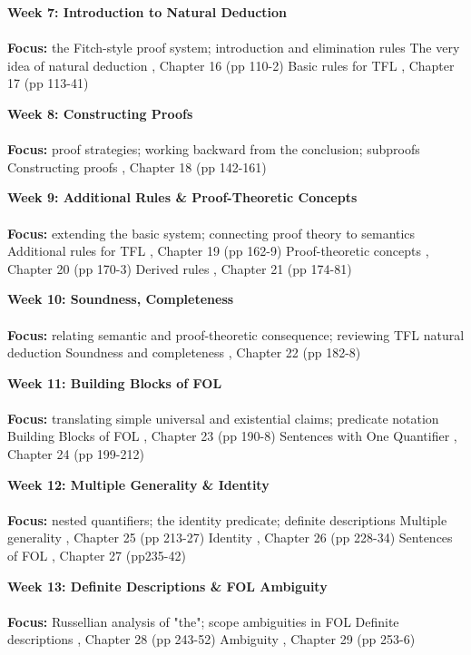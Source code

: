\documentclass{article}
\begin{document}
\begin{outline}[enumerate]
\1 \textbf{Week 7: Introduction to Natural Deduction}
\\
\\
\textbf{Focus:}
the Fitch-style proof system;
introduction and elimination rules
\2 The very idea of natural deduction \3 \cite{Mag25},  Chapter 16 (pp 110-2)
\2 Basic rules for TFL \3 \cite{Mag25},  Chapter 17 (pp 113-41)

\1 \textbf{Week 8: Constructing Proofs}
\\
\\
\textbf{Focus:}
proof strategies;
working backward from the conclusion;
subproofs
\2 Constructing proofs \3 \cite{Mag25},  Chapter 18 (pp 142-161)

\1 \textbf{Week 9: Additional Rules \& Proof-Theoretic Concepts}
\\
\\
\textbf{Focus:}
extending the basic system;
connecting proof theory to semantics
\2 Additional rules for TFL \3 \cite{Mag25},  Chapter 19 (pp 162-9)
\2 Proof-theoretic concepts \3 \cite{Mag25},  Chapter 20 (pp 170-3)
\2 Derived rules \3 \cite{Mag25},  Chapter 21 (pp 174-81)

\1 \textbf{Week 10: Soundness, Completeness}
\\
\\
\textbf{Focus:}
relating semantic and proof-theoretic consequence;
reviewing TFL natural deduction
\2 Soundness and completeness \3 \cite{Mag25},  Chapter 22 (pp 182-8)

\1 \textbf{Week 11: Building Blocks of FOL}
\\
\\
\textbf{Focus:}
translating simple universal and existential claims;
predicate notation
\2 Building Blocks of FOL \3 \cite{Mag25},  Chapter 23 (pp 190-8)
\2 Sentences with One Quantifier \3 \cite{Mag25},  Chapter 24 (pp 199-212)

\1 \textbf{Week 12: Multiple Generality \& Identity}
\\
\\
\textbf{Focus:}
nested quantifiers;
the identity predicate;
definite descriptions
\2 Multiple generality \3 \cite{Mag25},  Chapter 25 (pp 213-27)
\2 Identity \3 \cite{Mag25},  Chapter 26 (pp 228-34)
\2 Sentences of FOL \3 \cite{Mag25},  Chapter 27 (pp235-42)

\1 \textbf{Week 13: Definite Descriptions \& FOL Ambiguity}
\\
\\
\textbf{Focus:}
Russellian analysis of "the";
scope ambiguities in FOL
\2 Definite descriptions \3 \cite{Mag25},  Chapter 28 (pp 243-52)
\2 Ambiguity \3 \cite{Mag25},  Chapter 29 (pp 253-6)


\end{outline}
\end{document}
